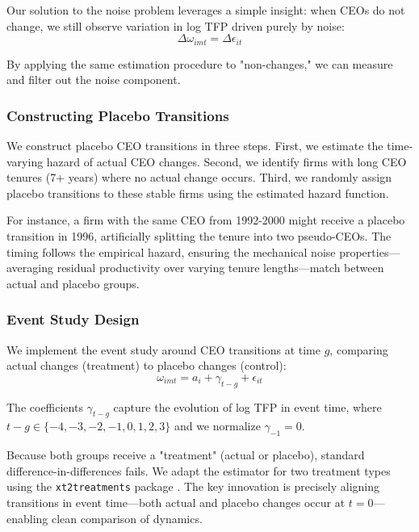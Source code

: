\documentclass[11pt,a4paper]{article}
\begin{document}
Our solution to the noise problem leverages a simple insight: when CEOs do not change, we still observe variation in log TFP driven purely by noise:
\begin{equation}
\Delta\omega_{imt} = \Delta\epsilon_{it}
\end{equation}

By applying the same estimation procedure to "non-changes," we can measure and filter out the noise component.

\subsubsection{Constructing Placebo Transitions}

We construct placebo CEO transitions in three steps. First, we estimate the time-varying hazard of actual CEO changes. Second, we identify firms with long CEO tenures (7+ years) where no actual change occurs. Third, we randomly assign placebo transitions to these stable firms using the estimated hazard function.

For instance, a firm with the same CEO from 1992-2000 might receive a placebo transition in 1996, artificially splitting the tenure into two pseudo-CEOs. The timing follows the empirical hazard, ensuring the mechanical noise properties—averaging residual productivity over varying tenure lengths—match between actual and placebo groups.

\subsubsection{Event Study Design}

We implement the event study around CEO transitions at time $g$, comparing actual changes (treatment) to placebo changes (control):
\begin{equation}
\omega_{imt} = a_i + \gamma_{t-g} + \epsilon_{it}
\end{equation}

The coefficients $\gamma_{t-g}$ capture the evolution of log TFP in event time, where $t-g \in \{-4, -3, -2, -1, 0, 1, 2, 3\}$ and we normalize $\gamma_{-1} = 0$.

Because both groups receive a "treatment" (actual or placebo), standard difference-in-differences fails. We adapt the \citet{Callaway2021JoLE} estimator for two treatment types using the \texttt{xt2treatments} package \citep{Koren2024xt2treatments}. The key innovation is precisely aligning transitions in event time—both actual and placebo changes occur at $t=0$—enabling clean comparison of dynamics.
\end{document}
